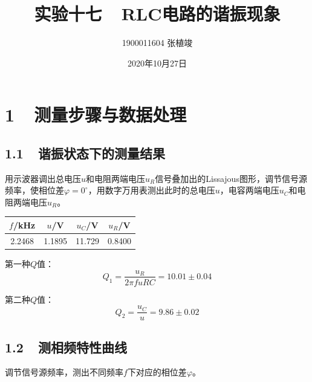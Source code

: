 \documentclass[a4paper,fontset=windows]{ctexart}
\begin{document}
\Large

    \title{\textbf{实验十七\ \ $\boldsymbol{RLC}$电路的谐振现象}}
    \author{\Large 1900011604 张植竣}
    \date{\Large 2020年10月27日}

    \maketitle


    \section*{ 1\ \ 测量步骤与数据处理}
    \bigskip

    \subsection*{ 1.1\ \ 谐振状态下的测量结果}

    用示波器调出总电压$u$和电阻两端电压$u_R$信号叠加出的Lissajous图形，调节信号源频率，使相位差$\varphi = 0^\circ$，用数字万用表测出此时的总电压$u$，电容两端电压$u_C$和电阻两端电压$u_R$。

    \begin{table}[ht!]\Large
        \begin{center}
            \begin{tabular}{|c|c|c|c|}
                \hline
                $f$/kHz & $u$/V & $u_C$/V & $u_R$/V \\
                \hline
                2.2468 & 1.1895 & 11.729 & 0.8400 \\
                \hline
            \end{tabular}
        \end{center}
    \end{table}
    \vspace{-0.5em}

    第一种$Q$值：
    \[
    Q_1 = \frac{u_R}{2\pi fuRC} = 10.01 \pm 0.04 
    \]

    第二种$Q$值：
    \[
    Q_2 = \frac{u_C}{u} = 9.86 \pm 0.02
    \]

    \newpage
    \subsection*{ 1.2\ \ 测相频特性曲线}

    调节信号源频率，测出不同频率$f$下对应的相位差$\varphi$。
\end{document}
